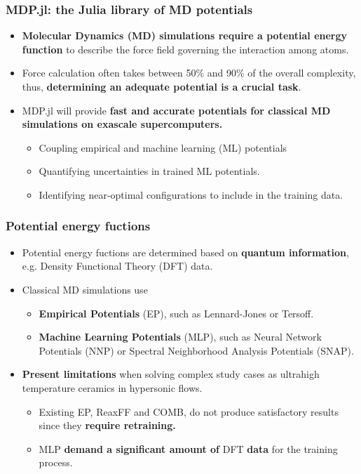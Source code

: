 \documentclass[10pt]{beamer}
\theoremstyle{remark}
\theoremstyle{definition}
\begin{document}
\begin{frame}
\frametitle{MDP.jl: the Julia library of MD potentials}

\begin{itemize}

\item \textbf{Molecular Dynamics (MD) simulations require a potential energy function} to describe the force field governing the interaction among atoms.
\pause
\item Force calculation often takes between 50\% and 90\% of the overall complexity, thus, \textbf{determining an adequate potential is a crucial task}.
\pause
\item MDP.jl will provide \textbf{fast and accurate potentials for classical MD simulations on exascale supercomputers.}
\begin{itemize}
    \item Coupling empirical and machine learning (ML) potentials
    \item Quantifying uncertainties in trained ML potentials. 
    \item Identifying near-optimal configurations to include in the training data.
\end{itemize}

\end{itemize}
\end{frame}


\begin{frame}
\frametitle{Potential energy fuctions}

\begin{itemize}
\item Potential energy fuctions are determined based on \textbf{quantum information}, e.g. Density Functional Theory (DFT) data.
\pause
\item Classical MD simulations use 
\begin{itemize}
    \item \textbf{Empirical Potentials} (EP), such as Lennard-Jones or Tersoff.
    \item \textbf{Machine Learning Potentials} (MLP), such as Neural Network Potentials (NNP) or Spectral Neighborhood Analysis Potentials (SNAP).
\end{itemize}
\pause
\item \textbf{Present limitations} when solving complex study cases as ultrahigh temperature ceramics in hypersonic flows.
\begin{itemize}
    \item Existing EP, ReaxFF and COMB, do not produce satisfactory results since they \textbf{require retraining.}
    \item MLP \textbf{demand a significant amount of} DFT \textbf{data} for the training process.
\end{itemize}
\end{itemize}
 
\end{frame}
	
\end{document}
